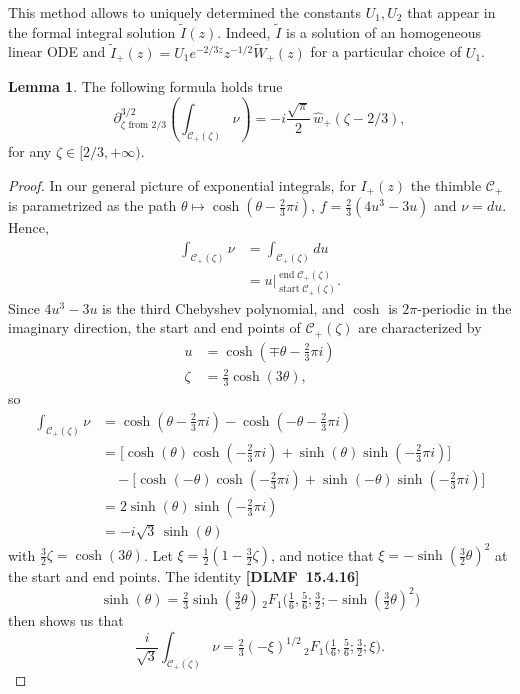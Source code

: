 \documentclass{article}
\theoremstyle{definition}
\newtheorem{lemma}[definition]{Lemma}
\begin{document}
This method allows to uniquely determined the constants $U_1,U_2$ that appear in the formal integral solution $\tilde{I}(z)$. Indeed, $\tilde{I}$ is a solution of an homogeneous linear ODE and $\tilde{I}_+(z)=U_1e^{-2/3z}z^{-1/2}\tilde{W}_+(z)$ for a particular choice of $U_1$. %
\begin{lemma}\label{claim 2}
The following formula holds true
\[ \partial^{3/2}_{\zeta \text{ from } 2/3} \left( \int_{\mathcal{C}_+(\zeta)} \nu \right) = -i \frac{\sqrt{\pi}}{2}\,\hat{w}_+(\zeta-2/3), \]
for any $\zeta\in [2/3,+\infty)$.
\end{lemma}
\begin{proof}
In our general picture of exponential integrals, for $I_+(z)$ the thimble $\mathcal{C}_+$ is parametrized as the path $\theta \mapsto \cosh(\theta - \tfrac{2}{3}\pi i)$, $f = \tfrac{2}{3}(4u^3 - 3u)$ and $\nu = du$. Hence,
\begin{align*}
\int_{\mathcal{C}_+(\zeta)} \nu & = \int_{\mathcal{C}_+(\zeta)} du \\
& = u \Big|_{\operatorname{start} \mathcal{C}_+(\zeta)}^{\operatorname{end} \mathcal{C}_+(\zeta)}.
\end{align*}
Since $4u^3 - 3u$ is the third Chebyshev polynomial, and $\cosh$ is $2\pi$-periodic in the imaginary direction, the start and end points of $\mathcal{C}_+(\zeta)$ are characterized by
\begin{align*}
u & = \cosh(\mp\theta - \tfrac{2}{3}\pi i) \\
\zeta & = \tfrac{2}{3} \cosh(3\theta),
\end{align*}
so
\begin{align*}
\int_{\mathcal{C}_+(\zeta)} \nu & = \cosh(\theta - \tfrac{2}{3}\pi i) - \cosh(-\theta - \tfrac{2}{3}\pi i) \\
& = \big[\cosh(\theta) \cosh(-\tfrac{2}{3}\pi i) + \sinh(\theta) \sinh(-\tfrac{2}{3}\pi i)\big] \\
& \quad - \big[\cosh(-\theta) \cosh(-\tfrac{2}{3}\pi i) + \sinh(-\theta) \sinh(-\tfrac{2}{3}\pi i)\big] \\
& = 2\sinh(\theta) \sinh(-\tfrac{2}{3}\pi i) \\
& = -i\sqrt{3}\,\sinh(\theta)
\end{align*}
with $\tfrac{3}{2} \zeta = \cosh(3\theta)$. Let $\xi = \tfrac{1}{2}(1 - \tfrac{3}{2}\zeta)$, and notice that $\xi = -\sinh(\tfrac{3}{2} \theta)^2$ at the start and end points. The identity \textbf{[DLMF~15.4.16]}
\[ \sinh(\theta) = \tfrac{2}{3} \sinh(\tfrac{3}{2} \theta)\,{}_2F_1\big(\tfrac{1}{6}, \tfrac{5}{6}; \tfrac{3}{2}; -\sinh(\tfrac{3}{2} \theta)^2\big) \]
then shows us that
\[ \frac{i}{\sqrt{3}} \int_{\mathcal{C}_+(\zeta)} \nu = \tfrac{2}{3} (-\xi)^{1/2}\,{}_2F_1\big(\tfrac{1}{6}, \tfrac{5}{6}; \tfrac{3}{2}; \xi\big). \]


\end{proof}
\end{document}
